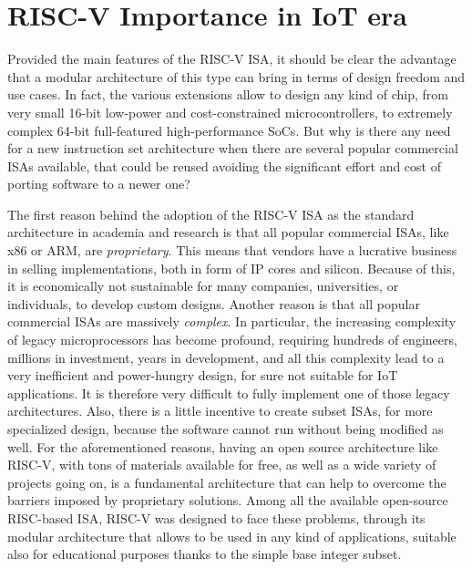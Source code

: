 \section{RISC-V Importance in IoT era}
Provided the main features of the RISC-V ISA, it should be clear the advantage that a modular architecture of this type can bring in terms of design freedom and use cases. In fact, the various extensions allow to design any kind of chip, from very small 16-bit low-power and cost-constrained microcontrollers, to extremely complex 64-bit full-featured high-performance SoCs. But why is there any need for a new instruction set architecture when there are several popular commercial ISAs available, that could be reused avoiding the significant effort and cost of porting software to a newer one?

The first reason behind the adoption of the RISC-V ISA as the standard architecture in academia and research is that all popular commercial ISAs, like x86 or ARM, are \emph{proprietary}. This means that vendors have a lucrative business in selling implementations, both in form of IP cores and silicon. Because of this, it is economically not sustainable for many companies, universities, or individuals, to develop custom designs. Another reason is that all popular commercial ISAs are massively \emph{complex}. In particular, the increasing complexity of legacy microprocessors has become profound, requiring hundreds of engineers, millions in investment, years in development, and all this complexity lead to a very inefficient and power-hungry design, for sure not suitable for IoT applications. It is therefore very difficult to fully implement one of those legacy architectures. Also, there is a little incentive to create subset ISAs, for more specialized design, because the software cannot run without being modified as well. For the aforementioned reasons, having an open source architecture like RISC-V, with tons of materials available for free, as well as a wide variety of projects going on, is a fundamental architecture that can help to overcome the barriers imposed by proprietary solutions. Among all the available open-source RISC-based ISA, RISC-V was designed to face these problems, through its modular architecture that allows to be used in any kind of applications, suitable also for educational purposes thanks to the simple base integer subset.

